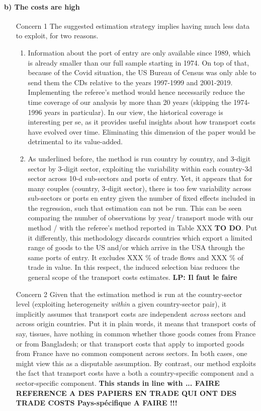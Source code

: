 \documentclass[a4paper,11pt]{article}
\begin{document}
\paragraph{b) The costs are high}
\begin{itemize}
\item[Concern 1] The suggested estimation strategy implies having much less data to exploit, for two reasons.
\begin{enumerate}
\item Information about the port of entry are only available since 1989, which is already smaller than our full sample starting
in 1974. On top of that, because of the Covid situation, the US Bureau of Census was only able to send them the CDs relative to the years 1997-1999 and 2001-2019. Implementing the referee's method would hence necessarily reduce the time coverage of our analysis by more than 20 years (skipping the 1974-1996 years in particular). In our view, the historical coverage is interesting per se, as it provides useful insights about how transport costs have evolved over time. Eliminating this dimension of the paper would be detrimental to its value-added.
\item As underlined before, the method is run country by country, and 3-digit sector by 3-digit sector, exploiting the variability within each country-3d sector across 10-d sub-sectors and ports of entry. Yet, it appears that for many couples (country, 3-digit sector), there is too few variability across sub-sectors or ports en entry given the number of fixed effects included in the regression, such that estimation can not be run. This can be seen comparing the number of observations by year/ transport mode with our method / with the referee's method reported in Table XXX \textbf{TO DO}. Put it differently, this methodology discards countries which export a limited range of goods to the US and/or which arrive in the USA through the same ports of entry. It excludes XXX \% of trade flows and XXX \% of trade in value. In this respect, the induced selection bias reduces the general scope of the transport costs estimates. \textbf{LP: Il faut le faire }

    \end{enumerate}
\item[Concern 2] Given that the estimation method is run at the country-sector level (exploiting heterogeneity \textit{within} a given country-sector pair), it implicitly assumes that transport costs are independent \textit{across} sectors and across origin countries. Put it in plain words, it means that transport costs of say, tissues, have nothing in common whether those goods comes from France or from Bangladesh; or that transport costs that apply to imported goods from France have no common component across sectors. In both cases, one might view this as a disputable assumption. By contrast, our method exploits the fact that transport costs have a both a country-specific component and a sector-specific component. \textbf{This stands in line with ...  FAIRE REFERENCE A DES PAPIERS EN TRADE QUI ONT DES TRADE COSTS Pays-spécifique A FAIRE !!! }



\end{itemize}
\end{document}
